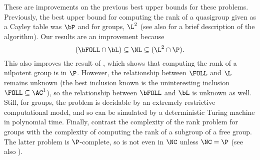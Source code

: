 \documentclass{article}
\begin{document}
These are improvements on the previous best upper bounds for these problems.
Previously, the best upper bound for computing the rank of a quasigroup given as a Cayley table was $\bP$ \autocite[Section~5]{py96} and for groups, $\L^2$ \autocite{lsz77} (see also \cite[Proposition~6]{at06} for a brief description of the algorithm).
Our results are an improvement because
\begin{equation*}
  (\bFOLL \cap \bL) \subseteq \NL \subseteq (\L^2 \cap \P).
\end{equation*}
This also improves the result of \cite[Theorem~7]{at06}, which shows that computing the rank of a nilpotent group is in $\P$.
However, the relationship between $\FOLL$ and $\L$ remains unknown (the best inclusion known is the uninteresting inclusion $\FOLL \subseteq \AC^1$), so the relationship between $\bFOLL$ and $\bL$ is unknown as well.
Still, for groups, the problem is decidable by an extremely restrictive computational model, and so can be simulated by a deterministic Turing machine in polynomial time.
Finally, contrast the complexity of the rank problem for groups with the complexity of computing the rank of a subgroup of a free group.
The latter problem is $\P$-complete, so is not even in $\NC$ unless $\NC = \P$ \autocite[Theorem~4.9]{am84} (see also \autocite[Problem~A.8.11]{ghr95}).

\end{document}
